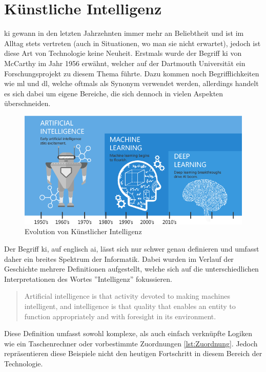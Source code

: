 \section{Künstliche Intelligenz}

\gls{ki} gewann in den letzten Jahrzehnten immer mehr an Beliebtheit und ist im Alltag stets vertreten (auch in Situationen, wo man sie nicht erwartet), jedoch ist diese Art von Technologie keine Neuheit. Erstmals wurde der Begriff \Gls{ki} von McCarthy im Jahr 1956 erwähnt, welcher auf der Dartmouth Universität ein Forschungsprojekt zu diesem Thema führte. \cite{100YAI} Dazu kommen noch Begrifflichkeiten wie \gls{ml} und \gls{dl}, welche oftmals als Synonym verwendet werden, allerdings handelt es sich dabei um eigene Bereiche, die sich dennoch in vielen Aspekten überschneiden.

\begin{figure}[h b]
    \centering
    \includegraphics[scale=0.55]{sections/machine-learning/images/ki-ml-dl.png}
    \caption{Evolution von Künstlicher Intelligenz}
\end{figure}

Der Begriff \gls{ki}, auf englisch \gls{ai}, lässt sich nur schwer genau definieren und umfasst daher ein breites Spektrum der Informatik. Dabei wurden im Verlauf der Geschichte mehrere Definitionen aufgestellt, welche sich auf die unterschiedlichen Interpretationen des Wortes ''Intelligenz'' fokussieren.

\begin{quote}
    Artificial intelligence is that activity devoted to making machines intelligent,
    and intelligence is that quality that enables an entity to function appropriately
    and with foresight in its environment. \cite{TQFAI}
\end{quote}

Diese Definition umfasst sowohl komplexe, als auch einfach verknüpfte Logiken wie ein Taschenrechner oder vorbestimmte Zuordnungen \ref*{lst:Zuordnung}. Jedoch repräsentieren diese Beispiele nicht den heutigen Fortschritt in diesem Bereich der Technologie.

